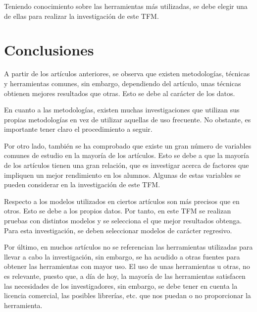 Teniendo conocimiento sobre las herramientas más utilizadas, se debe elegir una de ellas para realizar la investigación de este TFM.

\FloatBarrier

\section{Conclusiones}

A partir de los artículos anteriores, se observa que existen metodologías, técnicas y herramientas comunes, sin embargo, dependiendo del artículo, unas técnicas obtienen mejores resultados que otras. Esto se debe al carácter de los datos. 

En cuanto a las metodologías, existen muchas investigaciones que utilizan sus propias metodologías en vez de utilizar aquellas de uso frecuente. No obstante, es importante tener claro el procedimiento a seguir.

Por otro lado, también se ha comprobado que existe un gran número de variables comunes de estudio en la mayoría de los artículos. Esto se debe a que la mayoría de los artículos tienen una gran relación, que es investigar acerca de factores que impliquen un mejor rendimiento en los alumnos. Algunas de estas variables se pueden considerar en la investigación de este TFM.

Respecto a los modelos utilizados en ciertos artículos son más precisos que en otros. Esto se debe a los propios datos. Por tanto, en este TFM se realizan pruebas con distintos modelos y se selecciona el que mejor resultados obtenga. Para esta investigación, se deben seleccionar modelos de carácter regresivo.

Por último, en muchos artículos no se referencian las herramientas utilizadas para llevar a cabo la investigación, sin embargo, se ha acudido a otras fuentes para obtener las herramientas con mayor uso. El uso de unas herramientas u otras, no es relevante, puesto que, a día de hoy, la mayoría de las herramientas satisfacen las necesidades de los investigadores, sin embargo, se debe tener en cuenta la licencia comercial, las posibles librerías, etc. que nos puedan o no proporcionar la herramienta.



